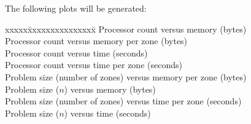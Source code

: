 \documentclass[10pt]{article}
\begin{document}
The following plots will be generated:

\begin{tabbing}
xxxxx\=xxxxxxxxxxxxxxx\=\kill
\>   \> Processor count versus memory (bytes) \\
\> \> Processor count versus memory per zone (bytes) \\
\> \> Processor count versus time (seconds) \\
\> \> Processor count versus time per zone (seconds) \\
\> \>  Problem size (number of zones) versus memory per zone (bytes) \\
\> \>  Problem size ($n$) versus memory (bytes) \\
\> \>  Problem size (number of zones) versus time per zone (seconds) \\
\> \>  Problem size ($n$) versus time (seconds)
\end{tabbing}

\EndDOCUMENT
\end{document}
